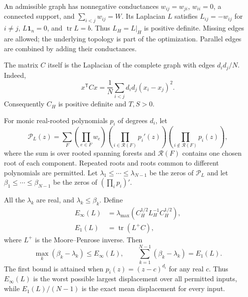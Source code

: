 An admissible graph has nonnegative conductances $w_{ij}=w_{ji}$,
$w_{ii}=0$, a connected support, and $\sum_{i<j}w_{ij}=W$. Its Laplacian
$L$ satisfies $L_{ij}=-w_{ij}$ for $i\ne j$, $L\mathbf1_n=0$, and
$\operatorname{tr}L=b$. Thus $L_H=L|_H$ is positive definite. Missing
edges are allowed; the underlying topology is part of the optimization.
Parallel edges are combined by adding their conductances.

The matrix $C$ itself is the Laplacian of the complete graph with edges
$d_i d_j/N$. Indeed,
\begin{equation}\label{net:eq:C-energy}
 x^{\mathsf T}Cx=\frac1N\sum_{i<j}d_i d_j(x_i-x_j)^2.
\end{equation}
Consequently $C_H$ is positive definite and $T,S>0$.

For monic real-rooted polynomials $p_i$ of degrees $d_i$, let
\begin{equation}\label{net:eq:forest}
 \mathcal P_L(z)=\sum_F
 \left(\prod_{e\in F}w_e\right)
 \left(\prod_{i\in\mathcal R(F)}p_i'(z)\right)
 \left(\prod_{i\notin\mathcal R(F)}p_i(z)\right),
\end{equation}
where the sum is over rooted spanning forests and $\mathcal R(F)$ contains
one chosen root of each component. Repeated roots and roots common to
different polynomials are permitted. Let $\lambda_1\le\cdots\le
\lambda_{N-1}$ be the zeros of $\mathcal P_L$ and let
$\beta_1\le\cdots\le\beta_{N-1}$ be the zeros of
$(\prod_i p_i)'$.

\begin{lemma}\label{net:lem:objectives}
All the $\lambda_k$ are real, and $\lambda_k\le\beta_k$. Define
\begin{align}
 E_{\infty}(L)
   &=\lambda_{\max}\!\left(C_H^{1/2}L_H^{-1}C_H^{1/2}\right),
       \label{net:eq:infty}\\
 E_1(L)&=\operatorname{tr}(L^+C), \label{net:eq:one}
\end{align}
where $L^+$ is the Moore--Penrose inverse. Then
\begin{equation}\label{net:eq:zero-objectives}
 \max_k(\beta_k-\lambda_k)\le E_{\infty}(L),\qquad
 \sum_{k=1}^{N-1}(\beta_k-\lambda_k)=E_1(L).
\end{equation}
The first bound is attained when $p_i(z)=(z-c)^{d_i}$ for any real $c$.
Thus $E_{\infty}(L)$ is the worst possible largest displacement over all
permitted inputs, while $E_1(L)/(N-1)$ is the exact mean displacement for
every input.
\end{lemma}

